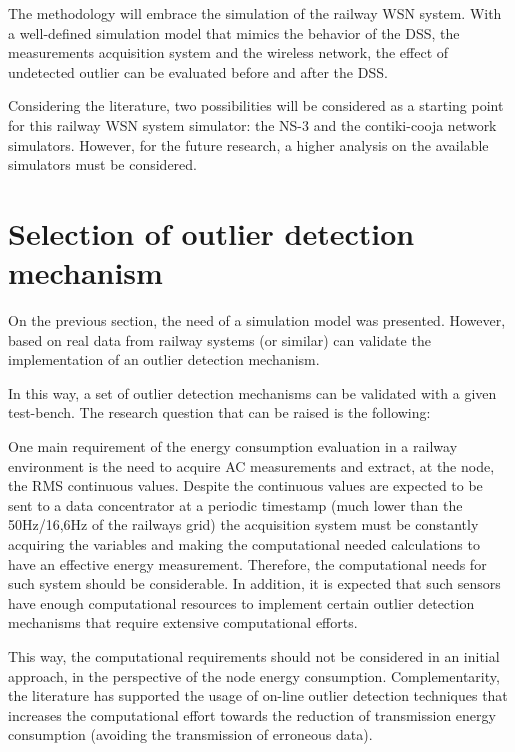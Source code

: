 The methodology will embrace the simulation of the railway WSN system. With a well-defined simulation model that mimics the behavior of the DSS, the measurements acquisition system and the wireless network, the effect of undetected outlier can be evaluated before and after the DSS.

Considering the literature, two possibilities will be considered as a starting point for this railway WSN system simulator: the NS-3 and the contiki-cooja network simulators. However, for the future research, a higher analysis on the available simulators must be considered.


\section{Selection of outlier detection mechanism}

On the previous section, the need of a simulation model was presented. However, based on real data from railway systems (or similar) can validate the implementation of an outlier detection mechanism.

In this way, a set of outlier detection mechanisms can be validated with a given test-bench. The research question that can be raised is the following:

\vspace{0.5em}
{}\par
\vspace{1.5em}

One main requirement of the energy consumption evaluation in a railway environment is the need to acquire AC measurements and extract, at the node, the RMS continuous values. Despite the continuous values are expected to be sent to a data concentrator at a periodic timestamp (much lower than the 50Hz/16,6Hz of the railways grid) the acquisition system must be constantly acquiring the variables and making the computational needed calculations to have an effective energy measurement. Therefore, the computational needs for such system should be considerable. In addition, it is expected that such sensors have enough computational resources to implement certain outlier detection mechanisms that require extensive computational efforts.

This way, the computational requirements should not be considered in an initial approach, in the perspective of the node energy consumption. Complementarity, the literature has supported the usage of on-line outlier detection techniques that increases the computational effort towards the reduction of transmission energy consumption (avoiding the transmission of erroneous data).

